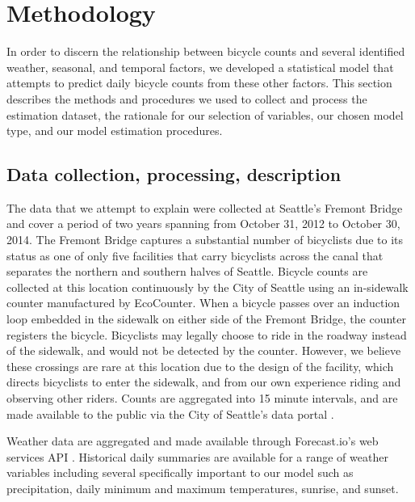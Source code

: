 \documentclass[12pt,letterpaper,article]{memoir} %
\begin{document}
\section*{Methodology}
In order to discern the relationship between bicycle counts and
several identified weather, seasonal, and temporal factors, we
developed a statistical model that attempts to predict daily bicycle
counts from these other factors. This section describes the methods
and procedures we used to collect and process the estimation dataset,
the rationale for our selection of variables, our chosen model type,
and our model estimation procedures.

\subsection*{Data collection, processing, description}
%
% 

The data that we attempt to explain were collected at Seattle's
Fremont Bridge and cover a period of two years spanning from October
31, 2012 to October 30, 2014. The Fremont Bridge captures a
substantial number of bicyclists due to its status as one of only five
facilities that carry bicyclists across the canal that separates the
northern and southern halves of Seattle. Bicycle counts are collected
at this location continuously by the City of Seattle using an
in-sidewalk counter manufactured by EcoCounter. When a bicycle passes
over an induction loop embedded in the sidewalk on either side of the
Fremont Bridge, the counter registers the bicycle. Bicyclists may
legally choose to ride in the roadway instead of the sidewalk, and
would not be detected by the counter. However, we believe these
crossings are rare at this location due to the design of the facility,
which directs bicyclists to enter the sidewalk, and from our own
experience riding and observing other riders. Counts are aggregated
into 15 minute intervals, and are made available to the public via the
City of Seattle's data
portal \parencite{City-of-Seattle:aa,City-of-Seattle:ab}.

Weather data are aggregated and made available through Forecast.io's
web services API \parencite{The-Dark-Sky-Company:aa}. Historical daily
summaries are available for a range of weather variables including
several specifically important to our model such as precipitation,
daily minimum and maximum temperatures, sunrise, and sunset.
\end{document}
